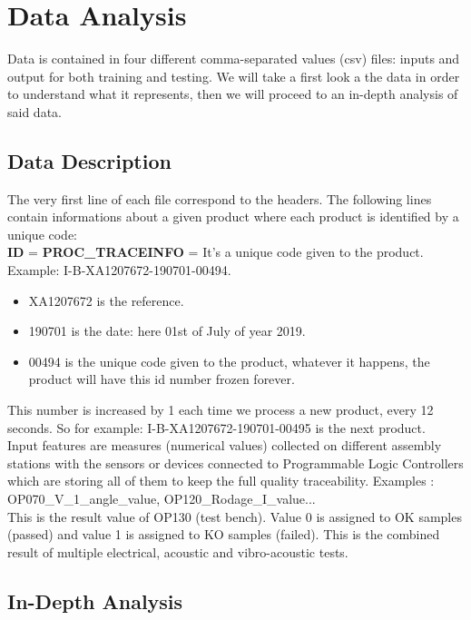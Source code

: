 \section{Data Analysis}
Data is contained in four different comma-separated values (csv) files: inputs and output for both training and testing. We will take a first look a the data in order to understand what it represents, then we will proceed to an in-depth analysis of said data.

\subsection{Data Description}
The very first line of each file correspond to the headers. The following lines contain informations about a given product where each product is identified by a unique code:\\

\textbf{ID} = \textbf{PROC\_TRACEINFO} = It's a unique code given to the product.\\
Example: I-B-XA1207672-190701-00494.
\begin{itemize}
    \item XA1207672 is the reference.  
    \item 190701 is the date: here 01st of July of year 2019.  
    \item 00494 is the unique code given to the product, whatever it happens, the product will have this id number frozen forever.
\end{itemize}

This number is increased by 1 each time we process a new product, every 12 seconds. So for example: I-B-XA1207672-190701-00495 is the next product.\\

Input features are measures (numerical values) collected on different assembly stations with the sensors or devices connected to Programmable Logic Controllers which are storing all of them to keep the full quality traceability. Examples : OP070\_V\_1\_angle\_value, OP120\_Rodage\_I\_value...\\

This is the result value of OP130 (test bench). Value 0 is assigned to OK samples (passed) and value 1 is assigned to KO samples (failed). This is the combined result of multiple electrical, acoustic and vibro-acoustic tests.

\subsection{In-Depth Analysis}

